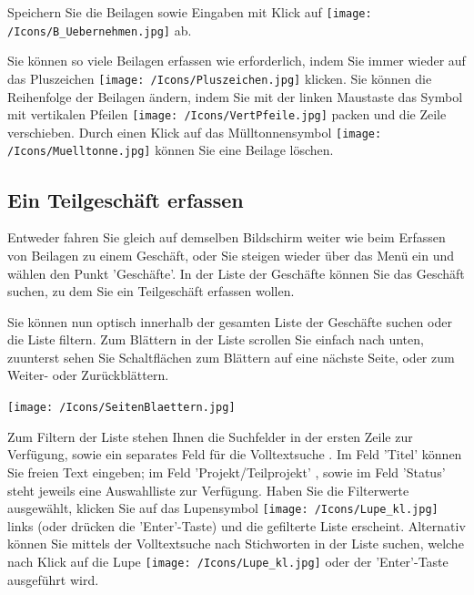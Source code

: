 \vspace{\baselineskip}

Speichern Sie die Beilagen sowie Eingaben mit Klick auf \texttt{[image: /Icons/B\_Uebernehmen.jpg]}  ab.


\vspace{\baselineskip}

Sie können so viele Beilagen erfassen wie erforderlich, indem Sie immer wieder auf das Pluszeichen \texttt{[image: /Icons/Pluszeichen.jpg]}  klicken. Sie können die Reihenfolge der Beilagen ändern, indem Sie mit der linken Maustaste das Symbol mit vertikalen Pfeilen \texttt{[image: /Icons/VertPfeile.jpg]}  packen und die Zeile verschieben. Durch einen Klick auf das Mülltonnensymbol \texttt{[image: /Icons/Muelltonne.jpg]}  können Sie eine Beilage löschen.


\subsection{Ein Teilgeschäft erfassen}

Entweder fahren Sie gleich auf demselben Bildschirm weiter wie beim Erfassen von Beilagen zu einem Geschäft, oder Sie steigen wieder über das Menü ein und wählen den Punkt 'Geschäfte'. In der Liste der Geschäfte können Sie das Geschäft suchen, zu dem Sie ein Teilgeschäft erfassen wollen.

\vspace{\baselineskip}

Sie können nun optisch innerhalb der gesamten Liste der Geschäfte suchen oder die Liste filtern. Zum Blättern in der Liste scrollen Sie einfach nach unten, zuunterst sehen Sie Schaltflächen zum Blättern auf eine nächste Seite, oder zum Weiter- oder Zurückblättern.

\begin{center}
\texttt{[image: /Icons/SeitenBlaettern.jpg]}
\end{center}

Zum Filtern der Liste stehen Ihnen die Suchfelder in der ersten Zeile zur Verfügung, sowie ein separates Feld für die Volltextsuche . Im Feld 'Titel'  können Sie freien Text eingeben; im Feld 'Projekt/Teilprojekt' , sowie im Feld 'Status'  steht jeweils eine Auswahlliste zur Verfügung. Haben Sie die Filterwerte ausgewählt, klicken Sie auf das Lupensymbol \texttt{[image: /Icons/Lupe\_kl.jpg]}  links (oder drücken die 'Enter'-Taste) und die gefilterte Liste erscheint. Alternativ können Sie mittels der Volltextsuche nach Stichworten in der Liste suchen, welche nach Klick auf die Lupe \texttt{[image: /Icons/Lupe\_kl.jpg]}  oder der 'Enter'-Taste ausgeführt wird.

